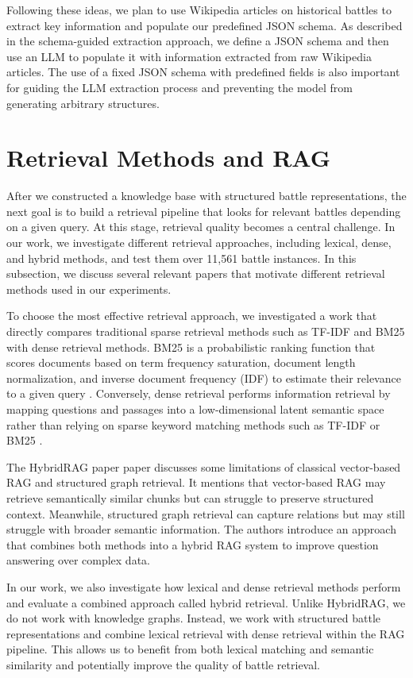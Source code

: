 Following these ideas, we plan to use Wikipedia articles on historical battles to extract key information and populate our predefined JSON schema. As described in the schema-guided extraction approach, we define a JSON schema and then use an LLM to populate it with information extracted from raw Wikipedia articles. The use of a fixed JSON schema with predefined fields is also important for guiding the LLM extraction process and preventing the model from generating arbitrary structures.
\section{Retrieval Methods and RAG}
After we constructed a knowledge base with structured battle representations, the next goal is to build a retrieval pipeline that looks for relevant battles depending on a given query. At this stage, retrieval quality becomes a central challenge. In our work, we investigate different retrieval approaches, including lexical, dense, and hybrid methods, and test them over 11,561 battle instances. In this subsection, we discuss several relevant papers that motivate different retrieval methods used in our experiments.

To choose the most effective retrieval approach, we investigated a work that directly compares traditional sparse retrieval methods such as TF-IDF and BM25 with dense retrieval methods. BM25 is a probabilistic ranking function that scores documents based on term frequency saturation, document length normalization, and inverse document frequency (IDF) to estimate their relevance to a given query \citep{robertson2009bm25}. Conversely, dense retrieval performs information retrieval by mapping questions and passages into a low-dimensional latent semantic space rather than relying on sparse keyword matching methods such as TF-IDF or BM25 \citep{karpukhin2020dpr}.

The HybridRAG paper \citep{sarmah2024hybridrag} paper discusses some limitations of classical vector-based RAG and structured graph retrieval. It mentions that vector-based RAG may retrieve semantically similar chunks but can struggle to preserve structured context. Meanwhile, structured graph retrieval can capture relations but may still struggle with broader semantic information. The authors introduce an approach that combines both methods into a hybrid RAG system to improve question answering over complex data. 

In our work, we also investigate how lexical and dense retrieval methods perform and evaluate a combined approach called hybrid retrieval. Unlike HybridRAG, we do not work with knowledge graphs. Instead, we work with structured battle representations and combine lexical retrieval with dense retrieval within the RAG pipeline. This allows us to benefit from both lexical matching and semantic similarity and potentially improve the quality of battle retrieval.
